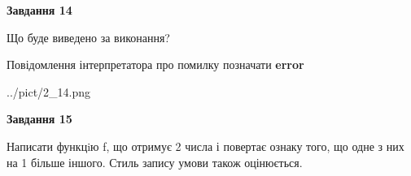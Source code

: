 \documentclass[11pt, ukrainian]{article}
\begin{document}
{\begin {large}
{\begin {center}\textbf{Завдання 14}\end {center}}\par
Що буде виведено за виконання? \par
Повідомлення інтерпретатора про помилку позначати \textbf{error}

\begin{center}
	{../pict/2_14.png}
\end{center}
\newpage

{\begin {center}\textbf{Завдання 15}\end {center}}\par

Написати функцiю f, що отримує 2 числа і повертає ознаку того, що одне з них на 1 більше іншого. Стиль запису умови також оцінюється.\par
\newpage

\end {large}}
\end{document}
